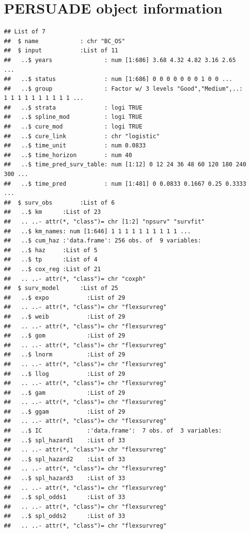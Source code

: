 \documentclass[
]{article}
\begin{document}
\clearpage

\hypertarget{persuade-object-information}{%
\section{PERSUADE object
information}\label{persuade-object-information}}

\begin{verbatim}
## List of 7
##  $ name            : chr "BC_OS"
##  $ input           :List of 11
##   ..$ years               : num [1:686] 3.68 4.32 4.82 3.16 2.65 ...
##   ..$ status              : num [1:686] 0 0 0 0 0 0 0 1 0 0 ...
##   ..$ group               : Factor w/ 3 levels "Good","Medium",..: 1 1 1 1 1 1 1 1 1 1 ...
##   ..$ strata              : logi TRUE
##   ..$ spline_mod          : logi TRUE
##   ..$ cure_mod            : logi TRUE
##   ..$ cure_link           : chr "logistic"
##   ..$ time_unit           : num 0.0833
##   ..$ time_horizon        : num 40
##   ..$ time_pred_surv_table: num [1:12] 0 12 24 36 48 60 120 180 240 300 ...
##   ..$ time_pred           : num [1:481] 0 0.0833 0.1667 0.25 0.3333 ...
##  $ surv_obs        :List of 6
##   ..$ km      :List of 23
##   .. ..- attr(*, "class")= chr [1:2] "npsurv" "survfit"
##   ..$ km_names: num [1:646] 1 1 1 1 1 1 1 1 1 1 ...
##   ..$ cum_haz :'data.frame': 256 obs. of  9 variables:
##   ..$ haz     :List of 5
##   ..$ tp      :List of 4
##   ..$ cox_reg :List of 21
##   .. ..- attr(*, "class")= chr "coxph"
##  $ surv_model      :List of 25
##   ..$ expo           :List of 29
##   .. ..- attr(*, "class")= chr "flexsurvreg"
##   ..$ weib           :List of 29
##   .. ..- attr(*, "class")= chr "flexsurvreg"
##   ..$ gom            :List of 29
##   .. ..- attr(*, "class")= chr "flexsurvreg"
##   ..$ lnorm          :List of 29
##   .. ..- attr(*, "class")= chr "flexsurvreg"
##   ..$ llog           :List of 29
##   .. ..- attr(*, "class")= chr "flexsurvreg"
##   ..$ gam            :List of 29
##   .. ..- attr(*, "class")= chr "flexsurvreg"
##   ..$ ggam           :List of 29
##   .. ..- attr(*, "class")= chr "flexsurvreg"
##   ..$ IC             :'data.frame':  7 obs. of  3 variables:
##   ..$ spl_hazard1    :List of 33
##   .. ..- attr(*, "class")= chr "flexsurvreg"
##   ..$ spl_hazard2    :List of 33
##   .. ..- attr(*, "class")= chr "flexsurvreg"
##   ..$ spl_hazard3    :List of 33
##   .. ..- attr(*, "class")= chr "flexsurvreg"
##   ..$ spl_odds1      :List of 33
##   .. ..- attr(*, "class")= chr "flexsurvreg"
##   ..$ spl_odds2      :List of 33
##   .. ..- attr(*, "class")= chr "flexsurvreg"

\end{verbatim}
\end{document}
